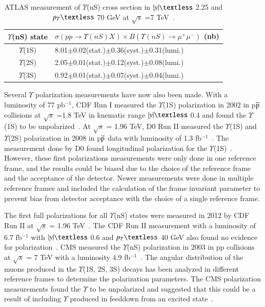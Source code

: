 \begin{table}
  \begin{center}
    \caption[]{ATLAS measurement of $\Upsilon$(nS) cross section in $|y|\textless$ 2.25 and $p_{T}\textless$ 70 GeV
      at $\surd s$ =7 TeV~\cite{ATLAS:2012lmu}.}
\label{Tab:ATLASYCross}
\begin{tabular}{cl} 
\hline 
\hline
$\Upsilon$(nS) state             &$ \sigma(pp \rightarrow \Upsilon(nS)X) \times B(\Upsilon(nS)\rightarrow\mu^{+}\mu^{-})$ (nb)    \\              
\hline
$\Upsilon$(1S)                   &8.01$\pm$0.02(stat.)$\pm$0.36(syst.)$\pm$0.31(lumi.)\\
$\Upsilon$(2S)                   &2.05$\pm$0.01(stat.)$\pm$0.12(syst.)$\pm$0.08(lumi.)\\
$\Upsilon$(3S)                   &0.92$\pm$0.01(stat.)$\pm$0.07(syst.)$\pm$0.04(lumi.)\\
\hline
\hline
\end{tabular}
\end{center}
\end{table}

Several $\Upsilon$ polarization measurements have now also been made. With a luminosity
of 77 pb$^{-1}$, CDF Run I measured the $\Upsilon$(1S) polarization in 2002 in 
p$\overline{\rm p}$ collisions at $\surd s$ =1.8 TeV in knematic range
$|y|\textless$ 0.4 and found the $\Upsilon$(1S) to be unpolarized~\cite{CDF:2001fdy}.
At $\surd s$  = 1.96 TeV, D0 Run II measured the $\Upsilon$(1S) and $\Upsilon$(2S) polarization in
2008 in p$\overline{\rm p}$ data
with luminosity of 1.3 fb$^{-1}$~\cite{D0:2008yos}. The measurement done by D0 found
longitudinal polarization for the $\Upsilon$(1S)~\cite{D0:2008yos}.
However, these first polarizations
measurements were only done in one reference frame, and the results could be biased due to the choice
of the reference frame and the acceptance of the detector. Newer measurements were done in multiple
reference frames and included the calculation of the frame invariant parameter to
prevent bias from detector acceptance with the choice of a single reference frame.


The first full polarizations for all $\Upsilon$(nS) states were measured in 2012 by
CDF Run II at $\surd s$  = 1.96 TeV~\cite{CDF:2011ag}.
The CDF Run II measurement with a luminosity of 6.7 fb$^{-1}$
with $|y|\textless$ 0.6 and $p_{T}\textless$ 40 GeV also found no evidence for
polarization~\cite{CDF:2011ag}.
CMS measured the $\Upsilon$(nS) polarization in 2003 in pp collisions
at $\surd s$  = 7 TeV with a luminosity 4.9 fb$^{-1}$~\cite{CMS:2012bpf}.
The angular distribution of the muons produced in the $\Upsilon$(1S, 2S, 3S)
decays has been analyzed in different reference frames to determine the
polarization parameters.
The CMS polarization measurements found the $\Upsilon$
to be unpolarized and suggested that this could be a result of including
$\Upsilon$ produced in feeddown from an excited state~\cite{CMS:2012bpf}.



